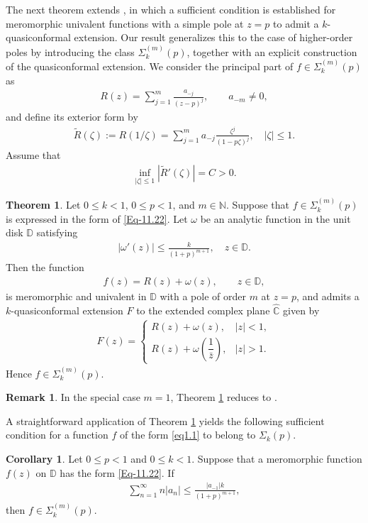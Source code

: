 \documentclass[a4paper,12pt]{amsart}
\theoremstyle{plain}
\theoremstyle{definition}
\newtheorem{thm}{Theorem}[section]
\newtheorem{cor}{Corollary}[section]
\newtheorem{rem}{Remark}[section]
\begin{document}
The next theorem extends \cite[Theorem 2]{Bhowmik-PAMS-2016},  in which a sufficient condition is established for meromorphic univalent functions with a simple pole at $z=p$ to admit a $k$-quasiconformal extension. Our result generalizes this to the case of higher-order poles by introducing the class $\Sigma_k^{(m)}(p)$, together with an explicit construction of the quasiconformal extension. We consider the principal part of $f\in \Sigma_k^{(m)}(p)$ as
\begin{align*}
	R(z) = \sum_{j=1}^{m} \frac{a_{-j}}{(z - p)^j}, \qquad a_{-m} \neq 0,
\end{align*}
and define its exterior form by
\begin{align*}
	\widetilde{R}(\zeta) := R(1/\zeta) = \sum_{j=1}^{m} a_{-j} \frac{\zeta^j}{(1 - p \zeta)^j}, 
	\quad |\zeta| \le 1.
\end{align*}
Assume that
\begin{align}\label{Eq-NonDeg}
	\inf_{|\zeta| \le 1} |\widetilde{R}'(\zeta)| = C > 0.
\end{align}
\begin{thm}\label{Thm-1.3}
	\label{Thm-2.2}
	Let $0 \le k < 1$, $0 \le p < 1$, and $m \in \mathbb{N}$. Suppose that $f \in \Sigma_k^{(m)}(p)$ is expressed in the form of \eqref{Eq-11.22}. Let $\omega$ be an analytic function in the unit disk $\mathbb{D}$ satisfying
	\begin{align}\label{Eq-omega-deriv}
		|\omega'(z)| \le \frac{k}{(1 + p)^{m+1}}, \quad z \in \mathbb{D}.
	\end{align}
	Then the function
	\begin{align*}
		f(z) = R(z) + \omega(z), \qquad z \in \mathbb{D},
	\end{align*}
	is meromorphic and univalent in $\mathbb{D}$ with a pole of order $m$ at $z = p$, and admits a $k$-quasiconformal extension $F$ to the extended complex plane $\widehat{\mathbb{C}}$ given by
	\begin{align*}
		F(z) =
		\begin{cases}
			R(z) + \omega(z), & |z| < 1,\\[4pt]
			R(z) + \omega\!\left( \dfrac{1}{\bar{z}} \right), & |z| > 1.
		\end{cases}
	\end{align*}
	Hence $f \in \Sigma^{(m)}_k(p)$.
\end{thm}
\begin{rem}
	In the special case $m=1$, Theorem \ref{Thm-1.3} reduces to \cite[Theorem 2]{Bhowmik-PAMS-2016}.
\end{rem}
A straightforward application of Theorem \ref{Thm-1.3} yields the following sufficient condition 
for a function $f$ of the form \eqref{eq1.1} to belong to $\Sigma_k(p)$.
\begin{cor}\label{Cor-1.1}
	Let $0 \leq p < 1$ and $0 \leq k < 1$. Suppose that a meromorphic function 
	$f(z)$ on $\mathbb{D}$ has the form \eqref{Eq-11.22}. If 
	\begin{align*}
		\sum_{n=1}^{\infty} n |a_n| \leq \frac{|a_{-1}|k}{(1+p)^{m+1}},
	\end{align*}
	then $f \in \Sigma^{(m)}_k(p)$.
\end{cor}
\end{document}
